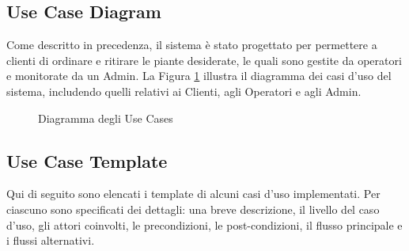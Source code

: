 \documentclass{article}
\begin{document}
\subsection{Use Case Diagram}
Come descritto in precedenza, il sistema è stato progettato per permettere a clienti di ordinare e ritirare le piante desiderate, le quali sono gestite da operatori e monitorate da un Admin. La Figura \ref{fig:diagram_usecases} illustra il diagramma dei casi d'uso del sistema, includendo quelli relativi ai Clienti, agli Operatori e agli Admin.

\begin{figure}[H]
    \centering
    \caption{Diagramma degli Use Cases}
    \label{fig:diagram_usecases}
\end{figure}

\subsection{Use Case Template}
Qui di seguito sono elencati i template di alcuni casi d'uso implementati. Per ciascuno sono specificati dei dettagli: una breve descrizione, il livello del caso d'uso, gli attori coinvolti, le precondizioni, le post-condizioni, il flusso principale e i flussi alternativi.
\end{document}
